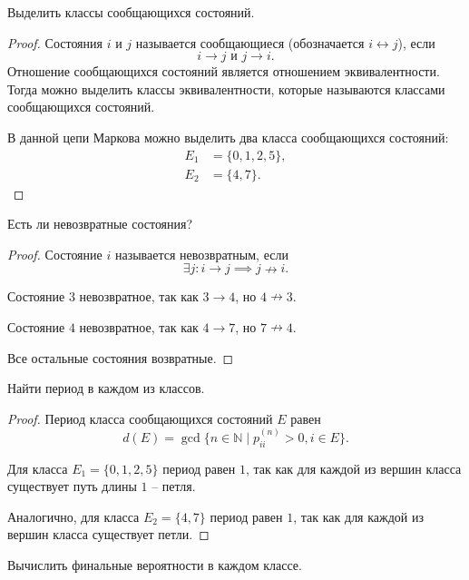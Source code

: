 \begin{problem}
Выделить классы сообщающихся состояний.
\end{problem}

\begin{proof}
    Состояния $i$ и $j$ называется сообщающиеся (обозначается $i \leftrightarrow j$), если
    \[
        i \to j \text{ и } j \to i.
    \]
    Отношение сообщающихся состояний является отношением эквивалентности.
    Тогда можно выделить классы эквивалентности, которые называются классами сообщающихся состояний.

    В данной цепи Маркова можно выделить два класса сообщающихся состояний:
    \[
        \begin{aligned}
            E_1 & = \{0, 1, 2, 5\}, \\
            E_2 & = \{4, 7\}.
        \end{aligned}
    \]
\end{proof}

\begin{problem}
Есть ли невозвратные состояния?
\end{problem}

\begin{proof}
    Состояние $i$ называется невозвратным, если
    \[
        \exists j: i \to j \implies  j \nrightarrow i .
    \]

    Состояние $3$ невозвратное, так как $3 \to 4$, но $4 \nrightarrow 3$.

    Состояние $4$ невозвратное, так как $4 \to 7$, но $7 \nrightarrow 4$.

    Все остальные состояния возвратные.
\end{proof}
\begin{problem}
Найти период в каждом из классов.
\end{problem}

\begin{proof}
    Период класса сообщающихся состояний $E$ равен
    \[
        d(E) = \gcd\{n \in \mathbb{N} \mid p_{ii}^{(n)} > 0, i \in E\}.
    \]

    Для класса $E_1 = \{0, 1, 2, 5\}$ период равен $1$, так как для каждой из вершин класса существует путь длины $1$ -- петля.

    Аналогично, для класса $E_2 = \{4, 7\}$ период равен $1$, так как для каждой из вершин класса существует петли.
\end{proof}

\begin{problem}
Вычислить финальные вероятности в каждом классе.
\end{problem}

